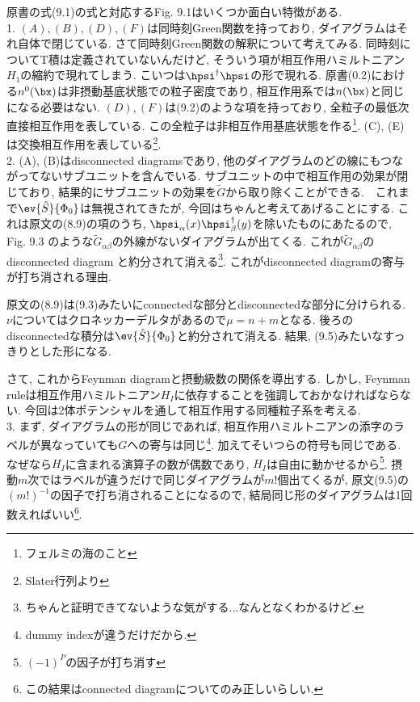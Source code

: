 \documentclass[10.5pt,a4paper]{jreport}
\begin{document}
原書の式(9.1)の式と対応するFig. 9.1はいくつか面白い特徴がある. \\

1. $(A), (B), (D), (F)$は同時刻Green関数を持っており, ダイアグラムはそれ自体で閉じている. さて同時刻Green関数の解釈について考えてみる. 同時刻についてT積は定義されていないんだけど, そういう項が相互作用ハミルトニアン$H_1$の縮約で現れてしまう. こいつは$\hpsi^\dagger\hpsi$の形で現れる. 原書(0.2)における$n^0(\bx)$は非摂動基底状態での粒子密度であり, 相互作用系では$n(\bx)$と同じになる必要はない. $(D), (F)$は(9.2)のような項を持っており, 全粒子の最低次直接相互作用を表している. この全粒子は非相互作用基底状態を作る\footnote{フェルミの海のこと}. (C), (E)は交換相互作用を表している\footnote{Slater行列より}.\\

2. (A), (B)はdisconnected diagramsであり, 他のダイアグラムのどの線にもつながってないサブユニットを含んでいる. サブユニットの中で相互作用の効果が閉じており, 結果的にサブユニットの効果を$\tilde{G}$から取り除くことができる.　これまで$\ev{\hat{S}}{\Phi_0}$は無視されてきたが, 今回はちゃんと考えてあげることにする. これは原文の(8.9)の項のうち, $\hpsi_\alpha(x)\hpsi_\beta^\dagger(y)$を除いたものにあたるので, Fig. 9.3 のような$\tilde{G}_{\alpha\beta}$の外線がないダイアグラムが出てくる. これが$\tilde{G}_{\alpha\beta}$のdisconnected diagram と約分されて消える\footnote{ちゃんと証明できてないような気がする...なんとなくわかるけど. }. これがdisconnected diagramの寄与が打ち消される理由.

原文の(8.9)は(9.3)みたいにconnectedな部分とdisconnectedな部分に分けられる. $\nu$についてはクロネッカーデルタがあるので$\mu = n + m$となる. 後ろのdisconnectedな積分は$\ev{\hat{S}}{\Phi_0}$と約分されて消える. 結果, (9.5)みたいなすっきりとした形になる.

さて, これからFeynman diagramと摂動級数の関係を導出する. しかし, Feynman ruleは相互作用ハミルトニアン$H_I$に依存することを強調しておかなければならない. 今回は2体ポテンシャルを通して相互作用する同種粒子系を考える. \\

3. まず, ダイアグラムの形が同じであれば, 相互作用ハミルトニアンの添字のラベルが異なっていても$G$への寄与は同じ\footnote{dummy indexが違うだけだから. }. 加えてそいつらの符号も同じである. なぜなら$H_I$に含まれる演算子の数が偶数であり, $H_I$は自由に動かせるから\footnote{$(-1)^P$の因子が打ち消す}. 摂動$m$次ではラベルが違うだけで同じダイアグラムが$m!$個出てくるが, 原文(9.5)の$(m!)^{-1}$の因子で打ち消されることになるので, 結局同じ形のダイアグラムは1回数えればいい\footnote{この結果はconnected diagramについてのみ正しいらしい. }.
\end{document}
